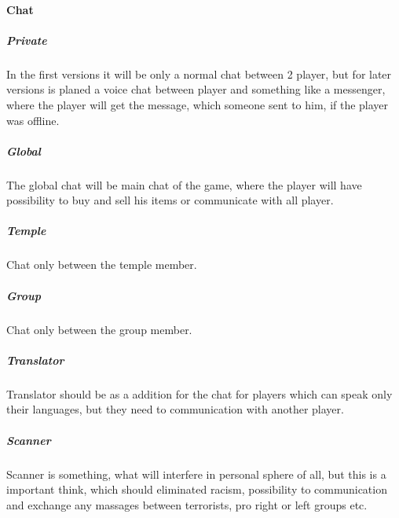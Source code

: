 \documentclass[parskip=full]{scrartcl}
\begin{document}
					\paragraph{Chat} \vspace{-5mm}
						\subparagraph{Private} \vspace{-5mm}
							\par \begingroup
							\leftskip=2cm
							\noindent
									In the first versions it will be only a normal chat between 2 player, but for later versions is planed a voice chat between player and something like a messenger, where the player will get the message, which someone sent to him, if the player was offline.
							\par \endgroup
						\subparagraph{Global} \vspace{-5mm}
							\par \begingroup
							\leftskip=2cm
							\noindent
									The global chat will be main chat of the game, where the player will have possibility to buy and sell his items or communicate with all player.
							\par \endgroup
						\subparagraph{Temple} \vspace{-5mm}
							\par \begingroup
							\leftskip=2cm
							\noindent
									Chat only between the temple member.
							\par \endgroup
						\subparagraph{Group} \vspace{-5mm}
							\par \begingroup
							\leftskip=2cm
							\noindent
									Chat only between the group member.
							\par \endgroup
						\subparagraph{Translator} \vspace{-5mm}
							\par \begingroup
							\leftskip=2cm
							\noindent
									Translator should be as a addition for the chat for players which can speak only their languages, but they need to communication with another player.
							\par \endgroup
						\subparagraph{Scanner} \vspace{-5mm}
							\par \begingroup
							\leftskip=2cm
							\noindent
									Scanner is something, what will interfere in personal sphere of all, but this is a important think, which should eliminated racism, possibility to communication and exchange any massages between terrorists, pro right or left groups etc. 
							\par \endgroup
\end{document}
